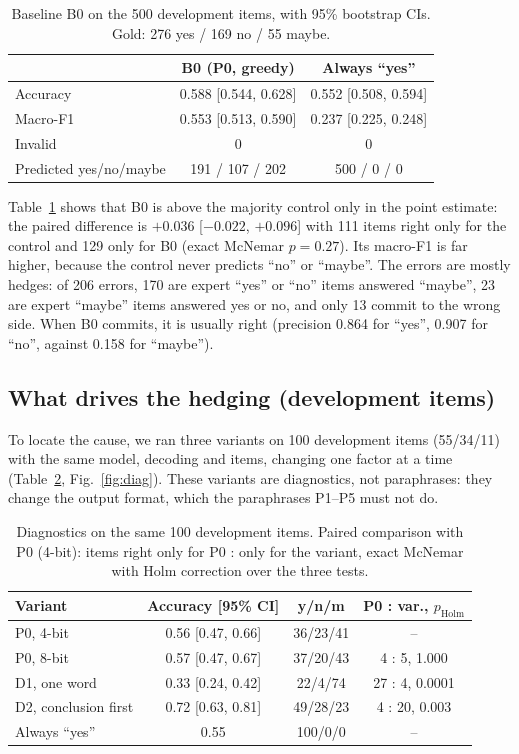 \documentclass[conference]{IEEEtran}
\begin{document}
\begin{table}[t]
\centering
\caption{Baseline B0 on the 500 development items, with 95\% bootstrap
CIs. Gold: 276 yes / 169 no / 55 maybe.}
\label{tab:b0}
\small
\begin{tabular}{@{}lcc@{}}
\toprule
 & B0 (P0, greedy) & Always ``yes'' \\
\midrule
Accuracy & 0.588 [0.544, 0.628] & 0.552 [0.508, 0.594] \\
Macro-F1 & 0.553 [0.513, 0.590] & 0.237 [0.225, 0.248] \\
Invalid & 0 & 0 \\
Predicted yes/no/maybe & 191 / 107 / 202 & 500 / 0 / 0 \\
\bottomrule
\end{tabular}
\end{table}

Table~\ref{tab:b0} shows that B0 is above the majority control only in the
point estimate: the paired difference is $+0.036$ [$-0.022$, $+0.096$]
with 111 items right only for the control and 129 only for B0 (exact
McNemar $p = 0.27$). Its macro-F1 is far higher, because the control never
predicts ``no'' or ``maybe''. The errors are mostly hedges: of 206
errors, 170 are expert ``yes'' or ``no'' items answered ``maybe'', 23 are
expert ``maybe'' items answered yes or no, and only 13 commit to the wrong
side. When B0 commits, it is usually right (precision 0.864 for ``yes'',
0.907 for ``no'', against 0.158 for ``maybe'').

\subsection{What drives the hedging (development items)}
To locate the cause, we ran three variants on 100 development items
(55/34/11) with the same model, decoding and items, changing one factor
at a time (Table~\ref{tab:diag}, Fig.~\ref{fig:diag}). These variants are
diagnostics, not paraphrases: they change the output format, which the
paraphrases P1--P5 must not do.

\begin{table}[t]
\centering
\caption{Diagnostics on the same 100 development items. Paired comparison
with P0 (4-bit): items right only for P0 : only for the variant, exact
McNemar with Holm correction over the three tests.}
\label{tab:diag}
\small
\setlength{\tabcolsep}{3pt}
\begin{tabular}{@{}lccc@{}}
\toprule
Variant & Accuracy [95\% CI] & y/n/m & P0 : var., $p_{\mathrm{Holm}}$ \\
\midrule
P0, 4-bit & 0.56 [0.47, 0.66] & 36/23/41 & -- \\
P0, 8-bit & 0.57 [0.47, 0.67] & 37/20/43 & 4 : 5, 1.000 \\
D1, one word & 0.33 [0.24, 0.42] & 22/4/74 & 27 : 4, 0.0001 \\
D2, conclusion first & 0.72 [0.63, 0.81] & 49/28/23 & 4 : 20, 0.003 \\
Always ``yes'' & 0.55 & 100/0/0 & -- \\
\bottomrule
\end{tabular}
\end{table}
\end{document}
